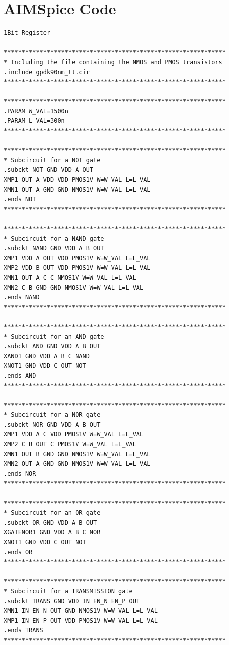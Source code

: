 \appendix
\section{AIMSpice Code}
\label{appendix:aimspice}

\begin{lstlisting}[style=aimspiceStyle, caption=1-bit register in AIMSPICE, label=testcode]
1Bit Register

**************************************************************
* Including the file containing the NMOS and PMOS transistors
.include gpdk90nm_tt.cir
**************************************************************

**************************************************************
.PARAM W_VAL=1500n
.PARAM L_VAL=300n
**************************************************************

**************************************************************
* Subcircuit for a NOT gate 
.subckt NOT GND VDD A OUT
XMP1 OUT A VDD VDD PMOS1V W=W_VAL L=L_VAL 
XMN1 OUT A GND GND NMOS1V W=W_VAL L=L_VAL
.ends NOT
**************************************************************

**************************************************************
* Subcircuit for a NAND gate 
.subckt NAND GND VDD A B OUT
XMP1 VDD A OUT VDD PMOS1V W=W_VAL L=L_VAL 
XMP2 VDD B OUT VDD PMOS1V W=W_VAL L=L_VAL 
XMN1 OUT A C C NMOS1V W=W_VAL L=L_VAL 
XMN2 C B GND GND NMOS1V W=W_VAL L=L_VAL 
.ends NAND
**************************************************************

**************************************************************
* Subcircuit for an AND gate 
.subckt AND GND VDD A B OUT
XAND1 GND VDD A B C NAND
XNOT1 GND VDD C OUT NOT
.ends AND
**************************************************************

**************************************************************
* Subcircuit for a NOR gate 
.subckt NOR GND VDD A B OUT
XMP1 VDD A C VDD PMOS1V W=W_VAL L=L_VAL 
XMP2 C B OUT C PMOS1V W=W_VAL L=L_VAL 
XMN1 OUT B GND GND NMOS1V W=W_VAL L=L_VAL 
XMN2 OUT A GND GND NMOS1V W=W_VAL L=L_VAL 
.ends NOR
**************************************************************

**************************************************************
* Subcircuit for an OR gate 
.subckt OR GND VDD A B OUT
XGATENOR1 GND VDD A B C NOR
XNOT1 GND VDD C OUT NOT
.ends OR
**************************************************************

**************************************************************
* Subcircuit for a TRANSMISSION gate 
.subckt TRANS GND VDD IN EN_N EN_P OUT
XMN1 IN EN_N OUT GND NMOS1V W=W_VAL L=L_VAL
XMP1 IN EN_P OUT VDD PMOS1V W=W_VAL L=L_VAL 
.ends TRANS
**************************************************************


\end{lstlisting}

